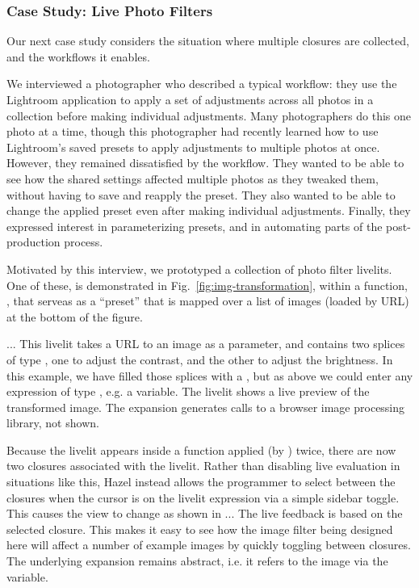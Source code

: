\subsubsection{Case Study: Live Photo Filters}\label{sec:image-transformation}
Our next case study 
considers the situation where multiple closures are collected, and 
the workflows it enables. 

We interviewed a photographer 
who described a typical workflow: 
they use the Lightroom application to 
apply a set of adjustments 
across all photos in a collection before making 
individual adjustments. 
Many photographers do this one photo at a time,
though this photographer had recently learned how to
use Lightroom's saved presets to 
apply adjustments to multiple photos at once.
However, they remained dissatisfied by the workflow.
They wanted to be able to see how the shared settings affected 
multiple photos as they tweaked them, without having to 
save and reapply the preset.
They also wanted to be able to change the applied preset
even after making individual adjustments.
Finally, they 
expressed interest in parameterizing  
presets, and in automating parts of the post-production process. 





Motivated by this interview, 
we prototyped a collection of photo filter livelits.
One of these,  is demonstrated in Fig.~\ref{fig:img-transformation},
within a function, , that serveas as a ``preset'' that is 
mapped over a list of images (loaded by URL) at the bottom of the figure. 

...
This livelit takes 
a URL to an image as a parameter, and contains two splices of type ,
one to adjust the contrast, and the other to adjust the brightness.
In this example, we have filled those splices with a , but 
as above we could enter any expression of type , e.g. a variable. 
The livelit shows a live preview of the transformed image.
The expansion generates calls to a browser image processing library, 
not shown.

Because the livelit appears inside a function applied (by ) twice, 
there are now two closures associated with the livelit. 
Rather than disabling live evaluation in situations like 
this, Hazel instead allows the programmer to select between the closures when 
the cursor is on the livelit expression via a simple sidebar toggle. 
This causes the view to change as shown in ...
The live feedback is based on the selected closure.
This makes it easy to see how the image filter being designed here will affect a
number of example images by quickly toggling between closures. 
The underlying expansion remains abstract, i.e. it refers to the image via the  variable.

